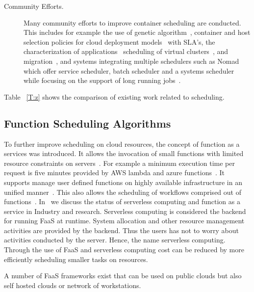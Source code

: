 \documentclass[final,5p,times,twocolumn]{elsarticle}
\begin{document}
\begin{description}
\item[Community Efforts.] Many community efforts to improve
container scheduling are conducted. This includes for example the use
of genetic algorithm~\cite{guerrero2018genetic}, container and host
selection policies for cloud deployment models~\cite{hanafy2017novel}
with SLA's, the characterization of
applications~\cite{medel2017client} scheduling of virtual
clusters~\cite{dziurzanskivalue}, and migration~\cite{Flocker2018},
and systems integrating multiple schedulers such as Nomad which offer
service scheduler, batch scheduler and a systems scheduler while
focusing on the support of long running jobs~\cite{Nomad2018}.
\end{description}
Table ~\ref{T:z} shows the comparison of existing work related to scheduling. 











\subsection{Function Scheduling Algorithms}
\label{sec:faas}



To further improve scheduling on cloud resources, the concept of
function as a services was introduced.  It allows the invocation of
small functions with limited resource constraints on
servers~\cite{lasbook}. For example a minimum execution time per
request is five minutes provided by AWS lambda and azure
functions~\cite{ServerlessComputing2018}. It supports manage user
defined functions on highly available infrastructure in an unified
manner~\cite{nastic2017serverless}. This also allows the scheduling of
workflows comprised out of
functions~\cite{alqaryouti2018serverless}. In~\cite{fox2017status} we
discuss the status of serverless computing and function as a service
in Industry and research.  Serverless computing is considered the
backend for running FaaS at runtime. System allocation and other
resource management activities are provided by the backend. Thus the
users has not to worry about activities conducted by the
server. Hence, the name serverless computing. Through the use of FaaS
and serverless computing cost can be reduced by more efficiently
scheduling smaller tasks on resources.

A number of FaaS frameworks exist that can be used on public clouds
but also self hosted clouds or network of workstations.
\end{document}
